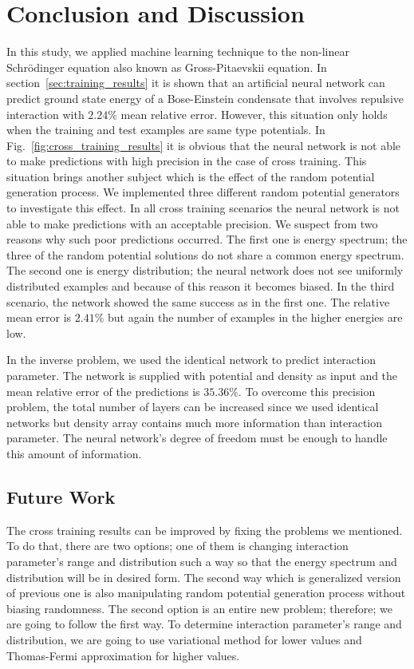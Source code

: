 \documentclass[a4paper,times,hidelinks,12pt]{article}
\begin{document}
\clearpage
\section{Conclusion and Discussion}

In this study, we applied machine learning technique to the non-linear Schr\"{o}dinger equation also known as Gross-Pitaevskii equation. In section~\ref{sec:training_results} it is shown that an artificial neural network can predict ground state energy of a Bose-Einstein condensate that involves repulsive interaction with $2.24\%$ mean relative error. However, this situation only holds when the training and test examples are same type potentials. In Fig.~\ref{fig:cross_training_results} it is obvious that the neural network is not able to make predictions with high precision in the case of cross training. This situation brings another subject which is the effect of the random potential generation process. We implemented three different random potential generators to investigate this effect. In all cross training scenarios the neural network is not able to make predictions with an acceptable precision. We suspect from two reasons why such poor predictions occurred. The first one is energy spectrum; the three of the random potential solutions do not share a common energy spectrum. The second one is energy distribution; the neural network does not see uniformly distributed examples and because of this reason it becomes biased. In the third scenario, the network showed the same success as in the first one. The relative mean error is $2.41\%$ but again the number of examples in the higher energies are low.  

In the inverse problem, we used the identical network to predict interaction parameter. The network is supplied with potential and density as input and the mean relative error of the predictions is $35.36\%$. To overcome this precision problem, the total number of layers can be increased since we used identical networks but density array contains much more information than interaction parameter. The neural network's degree of freedom must be enough to handle this amount of information. 

\subsection{Future Work}

The cross training results can be improved by fixing the problems we mentioned. To do that, there are two options; one of them is changing interaction parameter's range and distribution such a way so that the energy spectrum and distribution will be in desired form. The second way which is generalized version of previous one is also manipulating random potential generation process without biasing randomness. The second option is an entire new problem; therefore; we are going to follow the first way. To determine interaction parameter's range and distribution, we are going to use variational method for lower values and Thomas-Fermi approximation for higher values.
\end{document}
